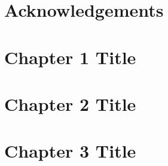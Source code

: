 \documentclass[12pt]{report}
\begin{document}
    \begin{spacing}{1.0}
        
            \newpage
        
            \thispagestyle{empty}
                \newpage
        
            \thispagestyle{empty}
                \newpage
    \end{spacing}

        \setcounter{page}{4} %
\begin{justify}
\begin{spacing}{1.0}

\end{spacing}
\newpage

\chapter*{} %





\chapter*{Acknowledgements}


\begin{spacing}{1.0}
\tableofcontents 
    \newpage
    
\listoffigures
    \newpage

\listoftables
\end{spacing}
    \newpage

    \setcounter{page}{1}
    
\chapter{Chapter 1 Title}


\chapter{Chapter 2 Title}


\chapter{Chapter 3 Title}



\end{justify}
\end{document}
